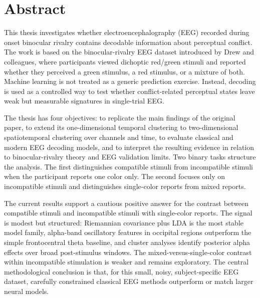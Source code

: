 \documentclass[11pt,a4paper,chapterprefix=false,parskip=false]{scrreprt}
\renewcommand*{\chapterpagestyle}{plain}
\begin{document}



\cleardoublepage
{}
\pagestyle{plain}
\renewcommand*{\chapterpagestyle}{plain}

\chapter*{Abstract}
This thesis investigates whether electroencephalography (EEG) recorded during onset binocular rivalry contains decodable information about perceptual conflict. The work is based on the binocular-rivalry EEG dataset introduced by Drew and colleagues, where participants viewed dichoptic red/green stimuli and reported whether they perceived a green stimulus, a red stimulus, or a mixture of both. Machine learning is not treated as a generic prediction exercise. Instead, decoding is used as a controlled way to test whether conflict-related perceptual states leave weak but measurable signatures in single-trial EEG.

The thesis has four objectives: to replicate the main findings of the original paper, to extend its one-dimensional temporal clustering to two-dimensional spatiotemporal clustering over channels and time, to evaluate classical and modern EEG decoding models, and to interpret the resulting evidence in relation to binocular-rivalry theory and EEG validation limits. Two binary tasks structure the analysis. The first distinguishes compatible stimuli from incompatible stimuli when the participant reports one color only. The second focuses only on incompatible stimuli and distinguishes single-color reports from mixed reports.

The current results support a cautious positive answer for the contrast between compatible stimuli and incompatible stimuli with single-color reports. The signal is modest but structured: Riemannian covariance plus LDA is the most stable model family, alpha-band oscillatory features in occipital regions outperform the simple frontocentral theta baseline, and cluster analyses identify posterior alpha effects over broad post-stimulus windows. The mixed-versus-single-color contrast within incompatible stimulation is weaker and remains exploratory. The central methodological conclusion is that, for this small, noisy, subject-specific EEG dataset, carefully constrained classical EEG methods outperform or match larger neural models.
\end{document}
